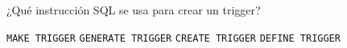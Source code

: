 \question[1] ¿Qué instrucción SQL se usa para crear un trigger?
\begin{choices}
\choice \texttt{MAKE TRIGGER}
\choice \texttt{GENERATE TRIGGER}
\CorrectChoice \texttt{CREATE TRIGGER}
\choice \texttt{DEFINE TRIGGER}
\end{choices}